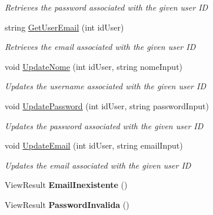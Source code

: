 \begin{DoxyCompactItemize}
\begin{DoxyCompactList}\small\item\em Retrieves the password associated with the given user ID \end{DoxyCompactList}\item 
string \mbox{\hyperlink{classmvc_j_j_m_s_1_1_controllers_1_1_utilizador_controller_a11bcddd35c8eeaaea9a7baf761b8f877}{Get\+User\+Email}} (int id\+User)
\begin{DoxyCompactList}\small\item\em Retrieves the email associated with the given user ID \end{DoxyCompactList}\item 
void \mbox{\hyperlink{classmvc_j_j_m_s_1_1_controllers_1_1_utilizador_controller_ae6ce52cd52288d470fb4d57da79dbffb}{Update\+Nome}} (int id\+User, string nome\+Input)
\begin{DoxyCompactList}\small\item\em Updates the username associated with the given user ID \end{DoxyCompactList}\item 
void \mbox{\hyperlink{classmvc_j_j_m_s_1_1_controllers_1_1_utilizador_controller_a9dec9a63e5d6e07567c884db33e69ef3}{Update\+Password}} (int id\+User, string password\+Input)
\begin{DoxyCompactList}\small\item\em Updates the password associated with the given user ID \end{DoxyCompactList}\item 
void \mbox{\hyperlink{classmvc_j_j_m_s_1_1_controllers_1_1_utilizador_controller_a11aabb148f5c11805d2fc9955a44a91d}{Update\+Email}} (int id\+User, string email\+Input)
\begin{DoxyCompactList}\small\item\em Updates the email associated with the given user ID \end{DoxyCompactList}\item 
\mbox{\label{classmvc_j_j_m_s_1_1_controllers_1_1_utilizador_controller_a2be8952c2ef886358ba107f962199a00}} 
View\+Result {\bfseries Email\+Inexistente} ()
\item 
\mbox{\label{classmvc_j_j_m_s_1_1_controllers_1_1_utilizador_controller_ac0481a2c0ce4068349866c229abaa9eb}} 
View\+Result {\bfseries Password\+Invalida} ()
\end{DoxyCompactItemize}
